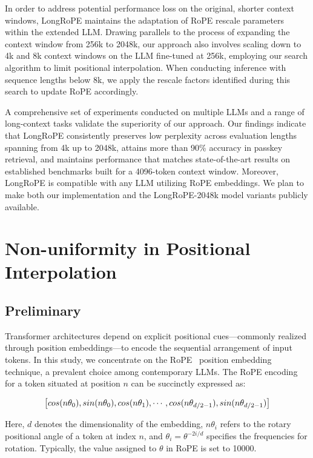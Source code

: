 In order to address potential performance loss on the original, shorter context windows, {LongRoPE} maintains the adaptation of RoPE rescale parameters within the extended LLM. Drawing parallels to the process of expanding the context window from 256k to 2048k, our approach also involves scaling down to 4k and 8k context windows on the LLM fine-tuned at 256k, employing our search algorithm to limit positional interpolation. When conducting inference with sequence lengths below 8k, we apply the rescale factors identified during this search to update RoPE accordingly.

A comprehensive set of experiments conducted on multiple LLMs and a range of long-context tasks validate the superiority of our approach. Our findings indicate that LongRoPE consistently preserves low perplexity across evaluation lengths spanning from 4k up to 2048k, attains more than 90\% accuracy in passkey retrieval, and maintains performance that matches state-of-the-art results on established benchmarks built for a 4096-token context window. Moreover, LongRoPE is compatible with any LLM utilizing RoPE embeddings. We plan to make both our implementation and the LongRoPE-2048k model variants publicly available.

\section{Non-uniformity in Positional Interpolation}
\label{sec:analysis}

\subsection{Preliminary}

Transformer architectures depend on explicit positional cues—commonly realized through position embeddings—to encode the sequential arrangement of input tokens. In this study, we concentrate on the RoPE~\cite{rope} position embedding technique, a prevalent choice among contemporary LLMs. The RoPE encoding for a token situated at position $n$ can be succinctly expressed as:

\begin{equation}
		\fontsize{7.8}{7.8} \selectfont
	\label{eq:rope}
	\left[ cos(n\theta_0), sin(n\theta_0), cos(n\theta_1), \cdots, cos(n\theta_{d/2-1}), sin(n\theta_{d/2-1}) \right]   
\end{equation}

Here, $d$ denotes the dimensionality of the embedding, $n\theta_i$ refers to the rotary positional angle of a token at index $n$, and $\theta_i = \theta^{-2i/d}$ specifies the frequencies for rotation. Typically, the value assigned to $\theta$ in RoPE is set to 10000.

